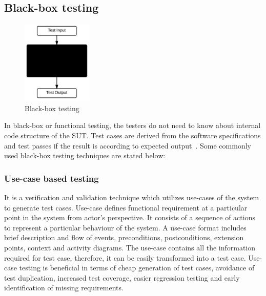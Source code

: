 \subsection{Black-box testing}
\begin{figure}
  \vspace{-35pt}
  \begin{center}
    \includegraphics[width=0.30\textwidth]{chapter2/blackBox.png}
  \end{center}
  \vspace{-20pt}
  \bigskip
  \caption{Black-box testing}
  \label{fig:blackBox}
  \vspace{-18pt}
\end{figure}
In black-box or functional testing, the testers do not need to know about internal code structure of the SUT. Test cases are derived from the software specifications and test passes if the result is according to expected output~\cite{beizer1995black}. Some commonly used black-box testing techniques are stated below:

\subsubsection{Use-case based testing}
It is a verification and validation technique which utilizes use-cases of the system to generate test cases. Use-case defines functional requirement at a particular point in the system from actor's perspective. It consists of a sequence of actions to represent a particular behaviour of the system. A use-case format includes brief description and flow of events, preconditions, postconditions, extension points, context and activity diagrams. The use-case contains all the information required for test case, therefore, it can be easily transformed into a test case. Use-case testing is beneficial in terms of cheap generation of test cases, avoidance of test duplication, increased test coverage, easier regression testing and early identification of missing requirements.  

